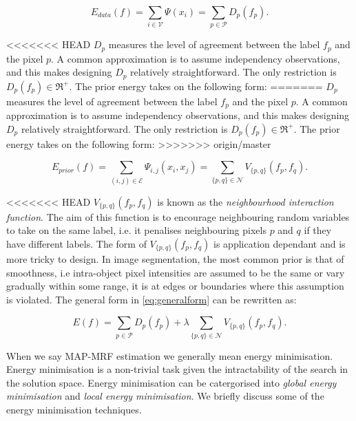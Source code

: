 \begin{equation}
	E_{data}(f) = \sum_{i \in \mathcal{V}} \Psi(x_i) =  \sum_{p \in \mathcal{P}}D_p(f_p).
	\label{eq:dataenergy}
\end{equation}

<<<<<<< HEAD
$D_p$ measures the level of agreement between the label $f_p$ and the pixel $p$.
A common approximation is to assume independency observations, and this makes designing $D_p$ relatively straightforward.
The only restriction is  $D_p(f_p) \in \Re^{+}$.
The prior energy takes on the following form:
=======
$D_p$ measures the level of agreement between the label $f_p$ and the pixel $p$. A common approximation is to assume independency observations, and this makes designing $D_p$ relatively straightforward. The only restriction is  $D_p(f_p) \in \Re^{+}$. The prior energy takes on the following form:
>>>>>>> origin/master

\begin{equation}
	E_{prior}(f) = \sum_{(i,j) \in \mathcal{E}}\Psi_{i,j}(x_i,x_j) = \sum_{\{p,q\} \in \mathcal{N}}V_{\{p,q\}}(f_p,f_q).
	\label{eq:priorenergy}
\end{equation}

<<<<<<< HEAD
$V_{\{p,q\}}(f_p,f_q)$ is known as the \textit{neighbourhood interaction function}.
The aim of this function is to encourage neighbouring random variables to take on the same label, i.e. it penalises neighbouring pixels $p$ and $q$ if they have different labels.
The form of $V_{\{p,q\}}(f_p,f_q)$ is application dependant and is more tricky to design.
In image segmentation, the most common prior is that of smoothness, i.e intra-object pixel intensities are assumed to be the same or vary gradually within some range, it is at edges or boundaries where this assumption is violated.
The general form in \autoref{eq:generalform} can be rewritten as:

\begin{equation}
	E(f) = \sum_{p \in \mathcal{P}}D_p(f_p) + \lambda \sum_{\{p,q\} \in \mathcal{N}}V_{\{p,q\}}(f_p,f_q).
	\label{eq:generalformexpanded}
\end{equation}
 
 When we say MAP-MRF estimation we generally mean energy minimisation.
 Energy minimisation is a non-trivial task given the intractability of the search in the solution space.
 Energy minimisation can be catergorised into \textit{global energy minimisation} and \textit{local energy minimisation}.
 We briefly discuss some of the energy minimisation techniques.
 
